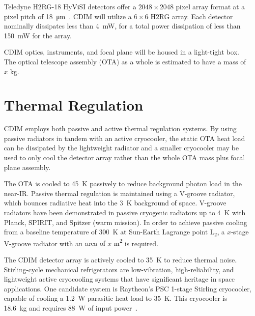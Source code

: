 \documentclass{ws-jai}
\begin{document}
Teledyne H2RG-18 HyViSI detectors offer a $2048\times2048$ pixel array format at a pixel pitch of \SI{18}{\micro\meter}~\cite{teledyneH2RG}.
CDIM will utilize a $6\times6$ H2RG array.
Each detector nominally dissipates less than \SI{4}{\milli\watt}, for a total power dissipation of less than \SI{150}{\milli\watt} for the array.

CDIM optics, instruments, and focal plane will be housed in a light-tight box.
The optical telescope assembly (OTA) as a whole is estimated to have a {\color{red}mass of $x$ \si{\kilo\gram}}.

\section{Thermal Regulation}
\label{sec:thermal}
CDIM employs both passive and active thermal regulation systems.
By using passive radiators in tandem with an active cryocooler, the static OTA heat load can be dissipated by the lightweight radiator and a smaller cryocooler may be used to only cool the detector array rather than the whole OTA mass plus focal plane assembly.

The OTA is cooled to \SI{45}{\kelvin} passively to reduce background photon load in the near-IR.\@
Passive thermal regulation is maintained using a V-groove radiator, which bounces radiative heat into the \SI{3}{\kelvin} background of space.
V-groove radiators have been demonstrated in passive cryogenic radiators up to \SI{4}{\kelvin} with Planck, SPIRIT, and Spitzer (warm mission).\@
In order to achieve passive cooling from a baseline temperature of \SI{300}{\kelvin} at Sun-Earth Lagrange point L$_2$, a {\color{red}$x$-stage} V-groove radiator with an {\color{red}area of $x$ \si{\meter\squared}} is required.

The CDIM detector array is actively cooled to \SI{35}{\kelvin} to reduce thermal noise.
Stirling-cycle mechanical refrigerators are low-vibration, high-reliability, and lightweight active cryocooling systems that have significant heritage in space applications.
One candidate system is Raytheon's PSC 1-stage Stirling cryocooler, capable of cooling a \SI{1.2}{\watt} parasitic heat load to \SI{35}{\kelvin}.
This cryocooler is \SI{18.6}{\kilo\gram} and requires \SI{88}{\watt} of input power~\cite{tchandbook2003}.

\end{document}
